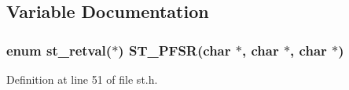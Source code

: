\subsection{Variable Documentation}
\subsubsection{\setlength{\rightskip}{0pt plus 5cm}enum \bf{st\_\-retval}($\ast$) \bf{ST\_\-PFSR}(char $\ast$, char $\ast$, char $\ast$)}\label{st_8h_abf6b24fea5dae72570318f9b1879627}




Definition at line 51 of file st.h.